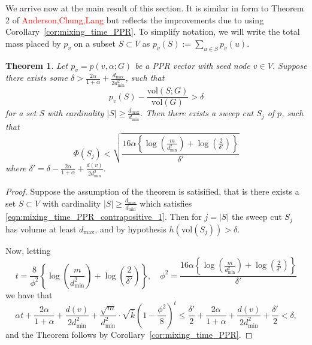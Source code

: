 \documentclass[11pt,twoside]{article}
\newtheorem{theorem}{Theorem}
\newcommand{\set}[1]{\left\{#1\right\}}
\newcommand{\vol}{\mathrm{vol}}
\newcommand{\abs}[1]{\left \lvert #1 \right \rvert}
\newcommand{\1}{\mathbf{1}}
\begin{document}
We arrive now at the main result of this section. It is similar in form to Theorem 2 of \textcolor{red}{Anderson,Chung,Lang} but reflects the improvements due to using Corollary~\ref{cor:mixing_time_PPR}. To simplify notation, we will write the total mass placed by $p_v$ on a subset $S \subset V$ as $p_v(S) := \sum_{u \in S} p_v(u)$.
\begin{theorem}
	\label{thm:mixing_time_PPR_contrapositive}
	Let $p_v = p(v,\alpha;G)$ be a PPR vector with seed node $v \in V$. Suppose there exists some $\delta > \frac{2\alpha}{1 + \alpha} + \frac{d_{\max}}{2d_{\min}^2}$, such that
	\begin{equation}
	\label{eqn:mixing_time_PPR_contrapositive_1}
	p_v(S) - \frac{\vol(S;G)}{\vol(G)} > \delta
	\end{equation}
	for a set $S$ with cardinality $\abs{S} \geq \frac{d_{\max}}{d_{\min}}$. Then there exists a sweep cut $S_j$ of $p$, such that
	\begin{equation*}
	\Phi(S_j) < \sqrt{\frac{16\alpha\left\{\log\left(\frac{m}{d_{\min}^2}\right) + \log\left(\frac{2}{\delta'}\right)\right\}}{\delta'}}
	\end{equation*}
	where $\delta' = \delta - \frac{2\alpha}{1 + \alpha} + \frac{d(v)}{2d_{\min}^2}$. 
\end{theorem}
\begin{proof}
	Suppose the assumption of the theorem is satisified, that is there exists a set $S \subset V$ with cardinality $\abs{S} \geq \frac{d_{\max}}{d_{\min}}$ which satisfies \eqref{eqn:mixing_time_PPR_contrapositive_1}. Then for $j = \abs{S}$ the sweep cut $S_j$ has volume at least $d_{\max}$, and by hypothesis $h(\vol(S_j)) >  \delta$.
	
	Now, letting
	\begin{equation*}
	t = \frac{8}{\phi^2}\left\{\log\left(\frac{m}{d_{\min}^2}\right) + \log\left(\frac{2}{\delta'}\right)\right\}, \quad \phi^2 = \frac{16\alpha\set{\log\left(\frac{m}{d_{\min}^2}\right) + \log(\frac{2}{\delta'})}}{\delta'}
	\end{equation*}
	we have that
	\begin{equation*}
	\alpha t + \frac{2\alpha}{1 + \alpha} + \frac{d(v)}{2d_{\min}^2} + \frac{\sqrt{m}}{d_{\min}^2} \cdot \sqrt{\overline{k}} \left(1 - \frac{\phi^2}{8}\right)^{t} \leq \frac{\delta'}{2} + \frac{2\alpha}{1 + \alpha} + \frac{d(v)}{2d_{\min}^2} + \frac{\delta'}{2} < \delta,
	\end{equation*}
	and the Theorem follows by Corollary~\ref{cor:mixing_time_PPR}.
\end{proof}
\end{document}
